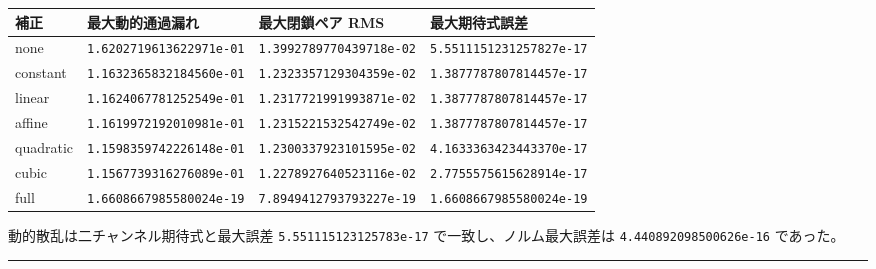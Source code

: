 \documentclass[
  a4paper,
]{article}
\newcounter{none} %
\begin{document}
{\def\LTcaptype{none} %
\begin{longtable}[]{@{}
  >{\raggedright\arraybackslash}p{}
  >{\raggedleft\arraybackslash}p{}
  >{\raggedleft\arraybackslash}p{}
  >{\raggedleft\arraybackslash}p{}@{}}
\toprule\noalign{}
\begin{minipage}[b]{\linewidth}\raggedright
補正
\end{minipage} & \begin{minipage}[b]{\linewidth}\raggedleft
最大動的通過漏れ
\end{minipage} & \begin{minipage}[b]{\linewidth}\raggedleft
最大閉鎖ペア RMS
\end{minipage} & \begin{minipage}[b]{\linewidth}\raggedleft
最大期待式誤差
\end{minipage} \\
\midrule\noalign{}
\endhead
\bottomrule\noalign{}
\endlastfoot
none & \texttt{1.6202719613622971e-01} & \texttt{1.3992789770439718e-02}
& \texttt{5.5511151231257827e-17} \\
constant & \texttt{1.1632365832184560e-01} &
\texttt{1.2323357129304359e-02} & \texttt{1.3877787807814457e-17} \\
linear & \texttt{1.1624067781252549e-01} &
\texttt{1.2317721991993871e-02} & \texttt{1.3877787807814457e-17} \\
affine & \texttt{1.1619972192010981e-01} &
\texttt{1.2315221532542749e-02} & \texttt{1.3877787807814457e-17} \\
quadratic & \texttt{1.1598359742226148e-01} &
\texttt{1.2300337923101595e-02} & \texttt{4.1633363423443370e-17} \\
cubic & \texttt{1.1567739316276089e-01} &
\texttt{1.2278927640523116e-02} & \texttt{2.7755575615628914e-17} \\
full & \texttt{1.6608667985580024e-19} & \texttt{7.8949412793793227e-19}
& \texttt{1.6608667985580024e-19} \\
\end{longtable}
}

動的散乱は二チャンネル期待式と最大誤差 \texttt{5.551115123125783e-17}
で一致し、ノルム最大誤差は \texttt{4.440892098500626e-16} であった。

\begin{center}\rule{0.5\linewidth}{0.5pt}\end{center}
\end{document}
